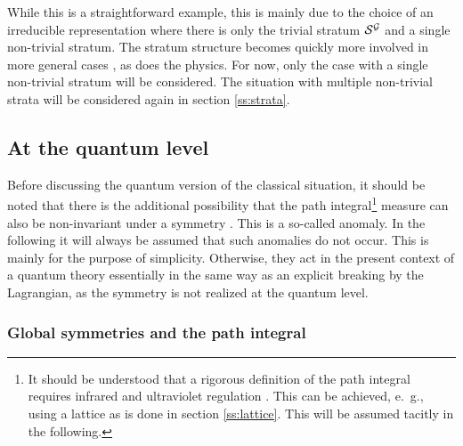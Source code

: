 \documentclass[final,12pt]{article}
\newcommand*{\1}{1\!\!\!\bot}
\begin{document}
While this is a straightforward example, this is mainly due to the choice of an irreducible representation where there is only the trivial stratum ${\cal S}^{\cal G}$ and a single non-trivial stratum. The stratum structure becomes quickly more involved in more general cases \cite{O'Raifeartaigh:1978kv}, as does the physics. For now, only the case with a single non-trivial stratum will be considered. The situation with multiple non-trivial strata will be considered again in section \ref{ss:strata}.

\subsection{At the quantum level}\label{s:hidssb}

Before discussing the quantum version of the classical situation, it should be noted that there is the additional possibility that the path integral\footnote{It should be understood that a rigorous definition of the path integral requires infrared and ultraviolet regulation \cite{Seiler:1982pw,Rivers:1987hi}. This can be achieved, e.\ g., using a lattice as is done in section \ref{ss:lattice}. This will be assumed tacitly in the following.} measure can also be non-invariant under a symmetry \cite{Bohm:2001yx,Bertlmann:1996xk}. This is a so-called anomaly. In the following it will always be assumed that such anomalies do not occur. This is mainly for the purpose of simplicity. Otherwise, they act in the present context of a quantum theory essentially in the same way as an explicit breaking by the Lagrangian, as the symmetry is not realized at the quantum level.

\subsubsection{Global symmetries and the path integral}\label{sss:metastable}
\end{document}
